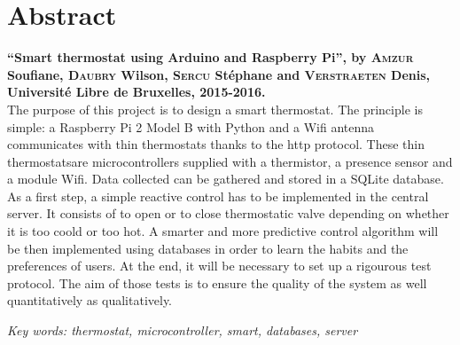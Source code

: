 \documentclass[11pt,a4paper,11pt]{report}
\begin{document}

\chapter*{Abstract}
\textbf{“Smart thermostat using Arduino and Raspberry Pi”,
by \textsc{Amzur} Soufiane, \textsc{Daubry} Wilson, \textsc{Sercu} Stéphane and \textsc{Verstraeten} Denis, Université Libre de Bruxelles, 2015-2016.}
\vspace{0.2cm}\\
The purpose of this project is to design a smart thermostat. The principle is simple: a Raspberry Pi 2 Model B with Python and a Wifi antenna communicates with \og thin thermostats \fg thanks to the http protocol. These \og thin thermostats\fg are microcontrollers supplied with a thermistor, a presence sensor and a module Wifi. Data collected can be gathered and stored in a SQLite database. As a first step, a simple reactive control has to be implemented in the central server. It consists of to open or to close thermostatic valve depending on whether it is too coold or too hot. A smarter and more predictive control algorithm will be then implemented using databases in order to learn the habits and the preferences of users. At the end, it will be necessary to set up a rigourous test protocol. The aim of those tests is to ensure the quality of the system as well quantitatively as qualitatively.\newline

\textit{Key words:  thermostat, microcontroller, smart, databases, server}%
\newline
\end{document}
